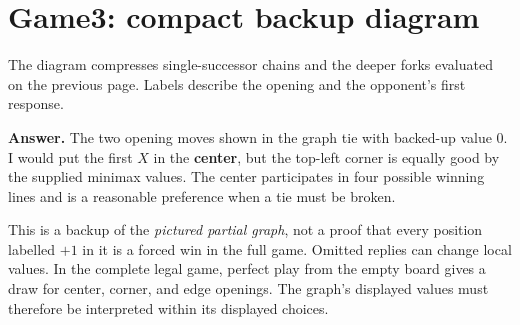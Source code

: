 \documentclass[11pt,a4paper]{article}
\begin{document}
\newpage
\section*{Game3: compact backup diagram}
The diagram compresses single-successor chains and the deeper forks evaluated on the previous page. Labels describe the opening and the opponent's first response.
\begin{center}\end{center}
\textbf{Answer.} The two opening moves shown in the graph tie with backed-up value $0$. I would put the first $X$ in the \textbf{center}, but the top-left corner is equally good by the supplied minimax values. The center participates in four possible winning lines and is a reasonable preference when a tie must be broken.

This is a backup of the \emph{pictured partial graph}, not a proof that every position labelled $+1$ in it is a forced win in the full game. Omitted replies can change local values. In the complete legal game, perfect play from the empty board gives a draw for center, corner, and edge openings. The graph's displayed values must therefore be interpreted within its displayed choices.
\end{document}
